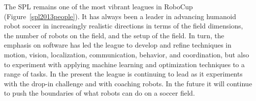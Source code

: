 \documentclass{llncs}
\begin{document}
The SPL remains one of the most vibrant leagues in RoboCup (Figure~\ref{spl2013people}). It has always been a leader in
advancing humanoid robot soccer in increasingly realistic directions in terms of the field dimensions, the
number of robots on the field, and the setup of the field. In turn, the emphasis on software has
led the league to develop
and refine techniques in motion, vision, localization, communication, behavior, and coordination, but also to experiment with applying machine learning and optimization techniques to a range of tasks. In the present the league is
continuing to lead as it experiments with the drop-in challenge and with coaching robots. In the future
it will continue to push the boundaries of what robots can do on a soccer field.


 
\end{document}
